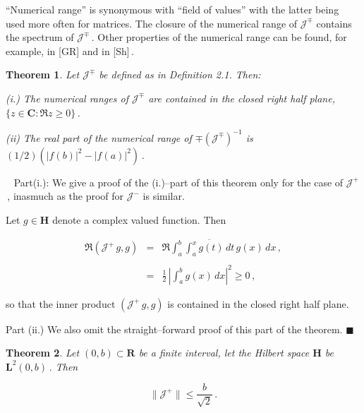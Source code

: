 \documentclass[11pt]{article}
\newtheorem{Theorem}{Theorem}[section]
\newenvironment{Proof}
{\bigskip\noindent{\bf Proof.}~\rm}{\bigskip}
\begin{document}
\noindent ``Numerical range'' is synonymous with ``field of values''
with the latter being used more often for matrices.  The closure of
the numerical range of ${\mathcal J}^\mp$ contains the spectrum of
${\mathcal J}^\mp$\,.  Other properties of the numerical range can be
found, for example, in [GR] and in [Sh]\,.

\begin{Theorem}%
     \label{theorem:2.2}
     Let ${\mathcal J}^\mp$ be defined as in Definition 2.1.  Then:

     (i.) The numerical ranges of ${\mathcal J}^\mp$ are contained in the
     closed right half plane, $\{z \in {\mathbf C} : \Re z \ge 0\}$\,.

     (ii) The real part of the numerical range of $\mp \left({\mathcal
       J}^\mp\right)^{-1}$ is $(1/2)(|f(b)|^2 - |f(a)|^2)$\,.
\end{Theorem}

\begin{Proof} Part(i.): We give a proof of the (i.)--part of this theorem 
  only for the case of ${\mathcal J}^+$\,, inasmuch as the proof for
  ${\mathcal J}^-$ is similar.

 \vspace{.1in} \noindent Let $g \in {\mathbf H}$ denote a
 complex valued function.  Then

\begin{equation}%
  \begin{array}{rcl} 
    \Re \left({\mathcal J}^+\,g,g\right) 
    & = & \displaystyle \Re \int_a^b \overline{\int_a^x g(t)\,dt} \,
    g(x)\,dx\,,  \\
    && \\
   & = & \displaystyle \frac{1}{2} \, \left|\int_a^b g(x) \, dx\right|^2
   \geq 0\,, 
  \end{array}
  \label{equation:2.2}
\end{equation}

\noindent so that the inner product $({\mathcal J}^+\,g,g)$ is contained in
the closed right half plane.

\vspace{.1in} \noindent Part (ii.) We also omit the straight--forward
proof of this part of the theorem.
 \end{Proof} $\blacksquare$

\begin{Theorem}
\label{theorem:2.3}
  Let $(0,b) \subset {\mathbf R}$ be a finite interval,
  let the Hilbert space ${\mathbf H}$ be ${\mathbf
    L}^2(0,b)$\,.  Then  

  \begin{equation}%
    \|{\mathcal J}^+\| \leq \frac{b}{\sqrt{2}}\,.
    \label{equation:2.3}
  \end{equation}

  \end{Theorem}
\end{document}
